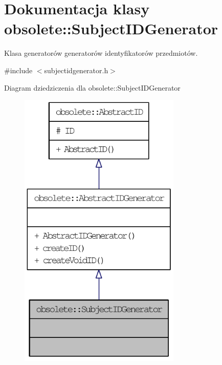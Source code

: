 \hypertarget{classobsolete_1_1SubjectIDGenerator}{
\section{Dokumentacja klasy obsolete::SubjectIDGenerator}
\label{classobsolete_1_1SubjectIDGenerator}
}


Klasa generatorów generatorów identyfikatorów przedmiotów.  




{\ttfamily \#include $<$subjectidgenerator.h$>$}



Diagram dziedziczenia dla obsolete::SubjectIDGenerator\nopagebreak
\begin{figure}[H]
\begin{center}
\leavevmode
\includegraphics[width=218pt]{classobsolete_1_1SubjectIDGenerator__inherit__graph}
\end{center}
\end{figure}


